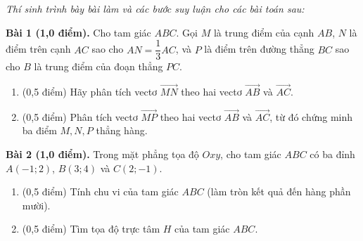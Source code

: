 \documentclass[10pt,a4paper]{article}
\newcommand{\parttitle}[1]{\par\vspace{3.5pt}\needspace{3\baselineskip}{\large\bfseries\color{ink}#1}\par\nopagebreak\vspace{2pt}}
\begin{document}
\vspace{3pt}
\parttitle{PHẦN IV. Tự luận}
\textit{Thí sinh trình bày bài làm và các bước suy luận cho các bài toán sau:}

\vspace{4pt}
\textbf{Bài 1 (1,0 điểm).} Cho tam giác $ABC$. Gọi $M$ là trung điểm của cạnh $AB$, $N$ là điểm trên cạnh $AC$ sao cho $AN = \dfrac{1}{3}AC$, và $P$ là điểm trên đường thẳng $BC$ sao cho $B$ là trung điểm của đoạn thẳng $PC$.
\begin{enumerate}[label=\alph*), itemsep=2pt]
    \item (0,5 điểm) Hãy phân tích vectơ $\vec{MN}$ theo hai vectơ $\vec{AB}$ và $\vec{AC}$.
    \item (0,5 điểm) Phân tích vectơ $\vec{MP}$ theo hai vectơ $\vec{AB}$ và $\vec{AC}$, từ đó chứng minh ba điểm $M, N, P$ thẳng hàng.
\end{enumerate}

\vspace{6pt}
\textbf{Bài 2 (1,0 điểm).} Trong mặt phẳng tọa độ $Oxy$, cho tam giác $ABC$ có ba đỉnh $A(-1; 2)$, $B(3; 4)$ và $C(2; -1)$.
\begin{enumerate}[label=\alph*), itemsep=2pt]
    \item (0,5 điểm) Tính chu vi của tam giác $ABC$ (làm tròn kết quả đến hàng phần mười).
    \item (0,5 điểm) Tìm tọa độ trực tâm $H$ của tam giác $ABC$.
\end{enumerate}
\end{document}
